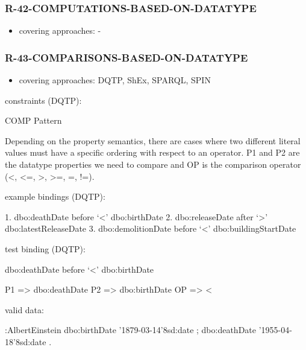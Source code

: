 \documentclass{llncs}
\begin{document}
\subsubsection{R-42-COMPUTATIONS-BASED-ON-DATATYPE}

\begin{itemize}
	\item covering approaches: -
\end{itemize}

\subsubsection{R-43-COMPARISONS-BASED-ON-DATATYPE}

\begin{itemize}
	\item covering approaches: DQTP, ShEx, SPARQL, SPIN
\end{itemize}

constraints (DQTP):

COMP Pattern \cite{Kontokostas2014} 

Depending on the property semantics,
there are cases where two different literal values must have
a specific ordering with respect to an operator. 
P1 and P2 are the datatype properties we need to compare and 
OP is the comparison operator (\textless, \textless=, \textgreater, \textgreater=, =, !=). 


example bindings (DQTP):

\begin{ex}
1. dbo:deathDate before ‘<’ dbo:birthDate
2. dbo:releaseDate after ‘>’ dbo:latestReleaseDate
3. dbo:demolitionDate before ‘<’ dbo:buildingStartDate
\end{ex}

test binding (DQTP):

dbo:deathDate before ‘\textless’ dbo:birthDate

\begin{ex}
P1 => dbo:deathDate
P2 => dbo:birthDate
OP => <
\end{ex}

valid data:

\begin{ex}
:AlbertEinstein
    dbo:birthDate '1879-03-14'^^xsd:date ;
    dbo:deathDate '1955-04-18'^^xsd:date .
\end{ex}
\end{document}
